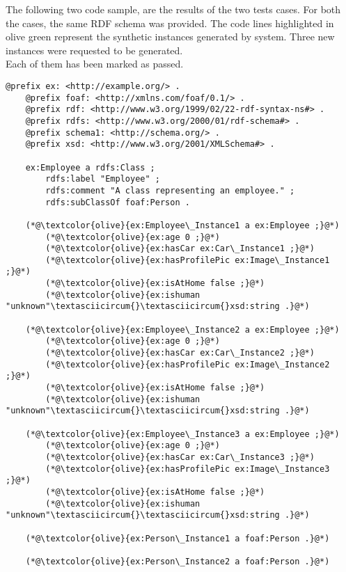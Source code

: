 The following two code sample, are the results of the two tests cases. For both the cases, the same RDF schema was provided. The code lines highlighted in olive green represent the synthetic instances generated by system. Three new instances were requested to be generated.
\\
Each of them has been marked as passed.
\\
\begin{lstlisting}[caption={Result Test Case 1.1}, label={lst:three-rdf-instances}]
    @prefix ex: <http://example.org/> .
    @prefix foaf: <http://xmlns.com/foaf/0.1/> .
    @prefix rdf: <http://www.w3.org/1999/02/22-rdf-syntax-ns#> .
    @prefix rdfs: <http://www.w3.org/2000/01/rdf-schema#> .
    @prefix schema1: <http://schema.org/> .
    @prefix xsd: <http://www.w3.org/2001/XMLSchema#> .
    
    ex:Employee a rdfs:Class ;
        rdfs:label "Employee" ;
        rdfs:comment "A class representing an employee." ;
        rdfs:subClassOf foaf:Person .
    
    (*@\textcolor{olive}{ex:Employee\_Instance1 a ex:Employee ;}@*)
        (*@\textcolor{olive}{ex:age 0 ;}@*)
        (*@\textcolor{olive}{ex:hasCar ex:Car\_Instance1 ;}@*)
        (*@\textcolor{olive}{ex:hasProfilePic ex:Image\_Instance1 ;}@*)
        (*@\textcolor{olive}{ex:isAtHome false ;}@*)
        (*@\textcolor{olive}{ex:ishuman "unknown"\textasciicircum{}\textasciicircum{}xsd:string .}@*)
    
    (*@\textcolor{olive}{ex:Employee\_Instance2 a ex:Employee ;}@*)
        (*@\textcolor{olive}{ex:age 0 ;}@*)
        (*@\textcolor{olive}{ex:hasCar ex:Car\_Instance2 ;}@*)
        (*@\textcolor{olive}{ex:hasProfilePic ex:Image\_Instance2 ;}@*)
        (*@\textcolor{olive}{ex:isAtHome false ;}@*)
        (*@\textcolor{olive}{ex:ishuman "unknown"\textasciicircum{}\textasciicircum{}xsd:string .}@*)
    
    (*@\textcolor{olive}{ex:Employee\_Instance3 a ex:Employee ;}@*)
        (*@\textcolor{olive}{ex:age 0 ;}@*)
        (*@\textcolor{olive}{ex:hasCar ex:Car\_Instance3 ;}@*)
        (*@\textcolor{olive}{ex:hasProfilePic ex:Image\_Instance3 ;}@*)
        (*@\textcolor{olive}{ex:isAtHome false ;}@*)
        (*@\textcolor{olive}{ex:ishuman "unknown"\textasciicircum{}\textasciicircum{}xsd:string .}@*)
    
    (*@\textcolor{olive}{ex:Person\_Instance1 a foaf:Person .}@*)
    
    (*@\textcolor{olive}{ex:Person\_Instance2 a foaf:Person .}@*)
    

\end{lstlisting}
